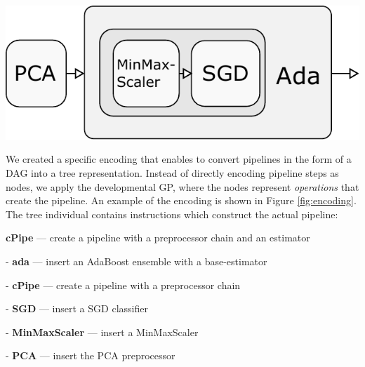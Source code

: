 \documentclass[a0paper,portrait]{baposter}
\begin{document}
\begin{poster}
{\begin{minipage}{\textwidth}
\begin{minipage}{.5\textwidth}
  \end{minipage}%
  \begin{minipage}{.5\textwidth}
    \centering
    \includegraphics[width=0.8\linewidth]{../img/ada-pdfa.pdf}
  \end{minipage}
  
  \label{fig:encoding}
\end{minipage}
\vspace{0.5em}

We created a specific encoding that enables to convert pipelines in the form of a DAG into
a tree representation. Instead of directly encoding pipeline steps as nodes, we apply the
developmental GP, where the nodes represent \emph{operations} that create the pipeline.
An example of the encoding is shown in Figure \ref{fig:encoding}. The tree individual
contains instructions which construct the actual pipeline:

\vspace{0.5em}
\textbf{cPipe} --- create a pipeline with a preprocessor chain and an estimator
\begin{compactitem}
  \item[-] \textbf{ada} --- insert an AdaBoost ensemble with a base-estimator
  \begin{compactitem}
    \item[-] \textbf{cPipe} --- create a pipeline with a preprocessor chain
    \begin{compactitem}
      \item[-] \textbf{SGD} --- insert a SGD classifier
      \item[-] \textbf{MinMaxScaler} --- insert a MinMaxScaler
    \end{compactitem}
  
  \end{compactitem}
  
  \item[-] \textbf{PCA} --- insert the PCA preprocessor
\end{compactitem}
}


\end{poster}
\end{document}
